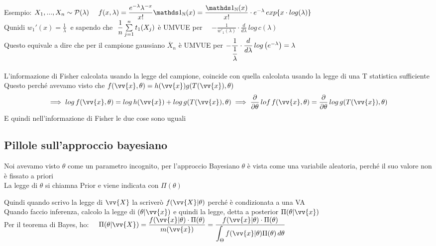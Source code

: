 Esempio: $\camp \sim \Pc (\lambda) \ \ \ \ f(x,\lambda) = \frac{e^{-\lambda} \lambda^{-x}}{x!} \II_{\NN}(x) = \frac{\II_{\NN}(x)}{x!}\cdot e^{-\lambda} \, exp \{x\cdot log(\lambda)\}$\\
Qunidi $w_1'(x)=\frac{1}{\lambda} \ $ e sapendo che $ \ \dfrac{1}{n} \sum\limits_{j=1}^{n} t_1(X_j)$ è UMVUE per \ \  $-\frac{1}{w'_1(\lambda)}\cdot \frac{d}{d\lambda}\, log\, c(\lambda)$\\

Questo equivale a dire che per il campione gaussiano $\overline{X}_n$ è UMVUE per  $-\dfrac{1}{\dfrac{1}{\lambda}} \cdot \dfrac{d}{d\lambda} \, log \left( e^{-\lambda}\right) = \lambda$\\ \\


L'informazione di Fisher calcolata usando la legge del campione, coincide con quella calcolata usando la legge di una T statistica sufficiente\\


Questo perché avevamo visto che $f(\vv{x},\theta) = h(\vv{x}) g(T(\vv{x}),\theta)$
\[
\implies log\, f(\vv{x},\theta) = log\, h(\vv{x}) + log\, g(T(\vv{x}),\theta) \implies \frac{\partial }{\partial \theta} \,  lof \, f(\vv{x},\theta)= \frac{\partial }{\partial \theta} \, log\, g(T(\vv{x}),\theta)  
\]
E quindi nell'informazione di Fisher le due cose sono uguali\\




\subsection{Pillole sull'approccio bayesiano}

Noi avevamo visto $\theta$ come un parametro incognito, per l'approccio Bayesiano $\theta$ è vista come una variabile aleatoria, perché il suo valore non è fissato a priori\\

La legge di $\theta$ si chiamna Prior e viene indicata con $\Pi(\theta)$

Quindi quando scrivo la legge di $\vv{X}$ la scriverò $f(\vv{X}|\theta)$ perché è condizionata a una VA\\

Quando faccio inferenza, calcolo la legge di  $(\theta | \vv{x})$ e quindi la legge, detta a posterior $\Pi(\theta| \vv{x})$\\
Per il teorema di Bayes, ho: \ \ $\Pi(\theta | \vv{X}) = \frac{f(\vv{x}|\theta)\cdot \Pi(\theta)}{m(\vv{x})}= \frac{f(\vv{x}|\theta)\cdot \Pi (\theta)}{\int_{\Theta} f(\vv{x}|\theta) \Pi(\theta) \, d\theta} $\\ \\


